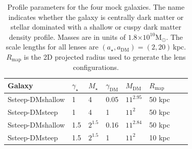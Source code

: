 \documentclass[galley,usenatbib]{mn2e}
\newcommand{\Rmap}{\ensuremath{R_\mathrm{map}}}
\newcommand{\Msun}{\ensuremath{\mathrm{M}_\odot}}
\newcommand{\e}[1]{\ensuremath{\times 10^{#1}}}
\newcommand{\mockAA}{{\sc Ssteep-DMshallow}}
\newcommand{\mockAC}{{\sc Ssteep-DMsteep}}
\newcommand{\mockBB}{{\sc Ssteep-DMshallow}}
\newcommand{\mockBC}{{\sc Ssteep-DMsteep}}
\begin{document}
\begin{table}
\begin{tabular}{llllllll}
Galaxy & $\gamma_\star$ & $M_\star$ & $\gamma_\mathrm{DM}$ & $M_\mathrm{DM}$ & $\Rmap$ \\
\hline
\mockAA & 1 & 4 & 0.05 & $11^{2.95}$ & 50 kpc\\ %
\mockAC & 1 & 4 & 1 & $11^2$ & 50 kpc \\ %
\mockBB & 1.5 & $2^{1.5}$ & 0.16 & $11^{2.84}$ & 50 kpc \\ %
\mockBC & 1.5 & $2^{1.5}$ & 1 & $11^2$ & 10 kpc %
\end{tabular}
\caption{Profile parameters for the four mock galaxies. The name indicates whether 
  the galaxy is centrally dark matter or stellar dominated with a shallow or cuspy 
  dark matter density profile.  Masses are in units of
  $1.8\e{10}\Msun$. The scale lengths for all lenses are
  $(a_\star,a_\mathrm{DM})=(2,20)$\,kpc. $\Rmap$ is the 2D projected radius
used to generate the lens configurations.}
\label{mock galaxy params}
\end{table}
\end{document}
